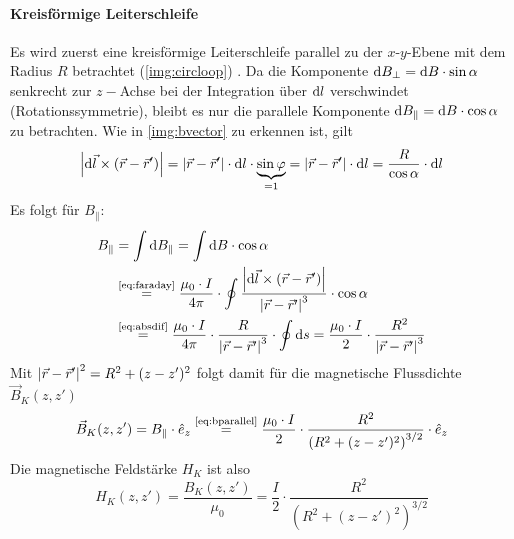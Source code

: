 \paragraph{Kreisförmige Leiterschleife}
Es wird zuerst eine kreisförmige Leiterschleife parallel zu der $x$-$y$-Ebene mit dem Radius $R$ betrachtet (\autoref{img:circloop}) \cite{dem2}. %
Da die Komponente $\mathrm{d} B_\perp = \mathrm{d} B \cdot \sin \alpha$ senkrecht zur $z-$Achse bei der Integration über $\mathrm{d} l$ verschwindet 
(Rotationssymmetrie), bleibt es nur die parallele Komponente $\mathrm{d} B_\parallel = \mathrm{d} B \cdot \cos \alpha$ zu betrachten. Wie in 
\autoref{img:bvector} zu erkennen ist, gilt
\begin{equation}
\label{eq:absdif}
  \left|\mathrm{d} \vec{l} \times \left( \vec{r} - \vec{r}' \right)\right| = \left|\vec{r} - \vec{r}'\right| \cdot \mathrm{d} l \cdot \underbrace{\sin \varphi}_{= 1} 
  = \left|\vec{r} - \vec{r}'\right| \cdot \mathrm{d} l = \frac{R}{\cos \alpha} \cdot \mathrm{d} l
\end{equation}
Es folgt für $B_\parallel$:
\begin{equation}
\begin{split}
  \label{eq:bparallel}
    B_\parallel &= \int \difd B_\parallel = \int \difd B \cdot \cos \alpha \\
  &\refeq{eq:faraday} \frac{\mu_0 \cdot I}{4 \pi} \cdot \oint \frac{\abs{\difd \vec{l} \times \left( \vec{r} - \vec{r}' \right)}}{\abs{\vec{r} - \vec{r}'}^3} \cdot \cos \alpha \\
  &\refeq{eq:absdif} \frac{\mu_0 \cdot I}{4 \pi} \cdot \frac{R}{\abs{\vec{r} - \vec{r}'}^3} \cdot \oint \difd s = \frac{\mu_0 \cdot I}{2} \cdot \frac{R^2}{\abs{\vec{r} - \vec{r}'}^3}
\end{split}
\end{equation}
Mit $\left|\vec{r} - \vec{r}'\right|^2 = R^2 + (z-z')^2$ folgt damit für die magnetische Flussdichte $\vec{B}_K(z, z')$
\begin{equation}
  \vec{B}_K(z, z') = B_\parallel \cdot \hat{e}_z \refeq{eq:bparallel} \frac{\mu_0 \cdot I}{2} \cdot \frac{R^2}{ \left( R^2 + (z-z')^2 \right)^{3/2}} \cdot \hat{e}_z
\end{equation}
Die magnetische Feldstärke $H_K$ ist also
\begin{equation}
  H_K(z, z') = \frac{B_K(z, z')}{\mu_0} = \frac{I}{2} \cdot \frac{R^2}{ \left( R^2 + (z-z')^2 \right)^{3/2}}
\end{equation}
